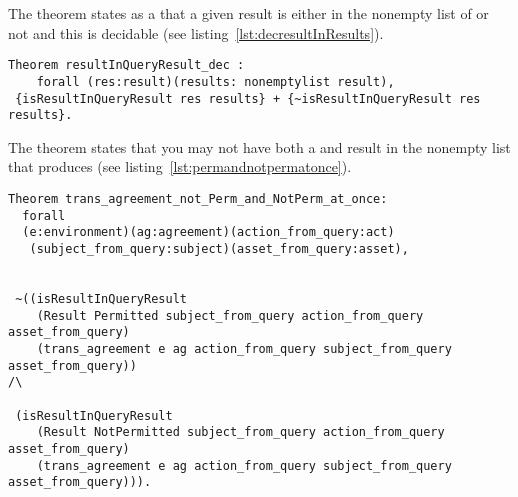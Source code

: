 The theorem  states as a  that a given result is either in the nonempty list of  or not and this is decidable (see listing~\ref{lst:decresultInResults}).

\begin{lstlisting}
Theorem resultInQueryResult_dec :
    forall (res:result)(results: nonemptylist result), 
 {isResultInQueryResult res results} + {~isResultInQueryResult res results}.
\end{lstlisting}

The theorem  states that you may not have both a  and  result in the nonempty list that  produces (see listing~\ref{lst:permandnotpermatonce}).

\begin{lstlisting}
Theorem trans_agreement_not_Perm_and_NotPerm_at_once:
  forall
  (e:environment)(ag:agreement)(action_from_query:act)
   (subject_from_query:subject)(asset_from_query:asset),


 ~((isResultInQueryResult 
    (Result Permitted subject_from_query action_from_query asset_from_query)
    (trans_agreement e ag action_from_query subject_from_query asset_from_query)) 
/\

 (isResultInQueryResult 
    (Result NotPermitted subject_from_query action_from_query asset_from_query)
    (trans_agreement e ag action_from_query subject_from_query asset_from_query))).

\end{lstlisting}

